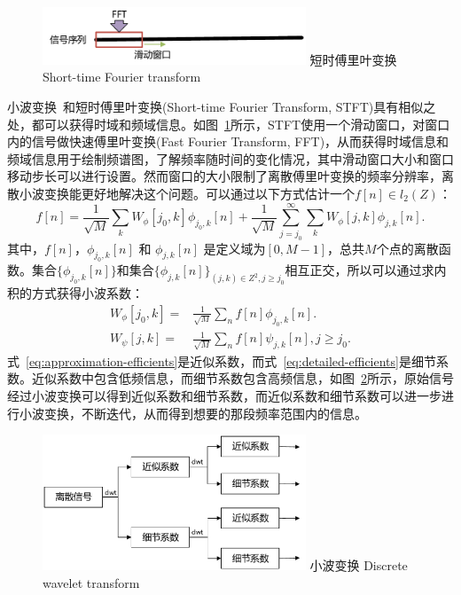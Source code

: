 \begin{figure}[!htp]
  \centering
  \includegraphics[width=0.7\textwidth]{figure/stft.pdf}
  \bicaption
    {短时傅里叶变换}
    {Short-time Fourier transform}
  \label{fig:stft}
\end{figure}
小波变换~\cite{chun2010tutorial}和短时傅里叶变换(Short-time Fourier Transform, STFT)具有相似之处，都可以获得时域和频域信息。如图~\ref{fig:stft}所示，STFT使用一个滑动窗口，对窗口内的信号做快速傅里叶变换(Fast Fourier Transform, FFT)，从而获得时域信息和频域信息用于绘制频谱图，了解频率随时间的变化情况，其中滑动窗口大小和窗口移动步长可以进行设置。然而窗口的大小限制了离散傅里叶变换的频率分辨率，离散小波变换能更好地解决这个问题。可以通过以下方式估计一个$f[n] \in l_{2}(Z)$：
\begin{equation}
f[n] = \frac{1}{\sqrt{M}}\sum_{k} W_{\phi}[j_{0},k]\phi_{j_{0},k}[n] + \frac{1}{\sqrt{M}}\sum_{j=j_{0}}^{\infty}\sum_{k}W_{\phi}[j,k]\phi_{j,k}[n].
\end{equation}
其中，$f[n]$，$\phi_{j_{0},k}[n]$ 和 $\phi_{j,k}[n]$ 是定义域为$[0,M-1]$，总共$M$个点的离散函数。集合$\{\phi_{j_{0},k}[n]\}$和集合$\{\phi_{j,k}[n]\}_{(j,k)\in Z^{2}, j \geq j_{0}}$相互正交，所以可以通过求内积的方式获得小波系数：
\begin{align}
W_{\phi}[j_{0},k]=&\frac{1}{\sqrt{M}}\sum_{n}f[n]\phi_{j_{0},k}[n]. \label{eq:approximation-efficients} \\
W_{\psi}[j,k] =& \frac{1}{\sqrt{M}}\sum_{n}f[n]\psi_{j,k}[n],  j \geq j_{0}. \label{eq:detailed-efficients}
\end{align}
式~\ref{eq:approximation-efficients}是近似系数，而式~\ref{eq:detailed-efficients}是细节系数。近似系数中包含低频信息，而细节系数包含高频信息，如图~\ref{fig:dwt}所示，原始信号经过小波变换可以得到近似系数和细节系数，而近似系数和细节系数可以进一步进行小波变换，不断迭代，从而得到想要的那段频率范围内的信息。
\begin{figure}[!htp]
  \centering
  \includegraphics[width=0.7\textwidth]{figure/dwt.pdf}
  \bicaption
    {小波变换}
    {Discrete wavelet transform}
  \label{fig:dwt}
\end{figure}

